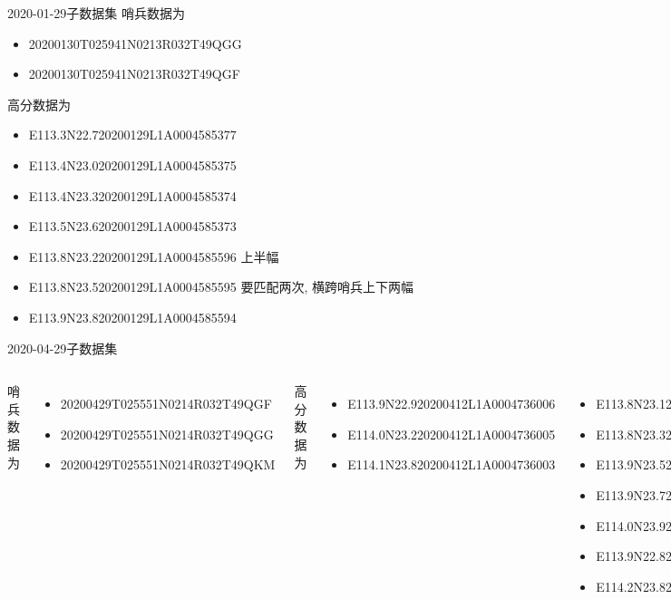 \begin{frame}{2020-01-29子数据集}
    \small 哨兵数据为
    \tiny
    \begin{itemize}
        \item 20200130T025941N0213R032T49QGG
        \item 20200130T025941N0213R032T49QGF
    \end{itemize}
    \small 高分数据为
    \tiny
    \begin{itemize}
        \item E113.3N22.720200129L1A0004585377
        \item E113.4N23.020200129L1A0004585375
        \item E113.4N23.320200129L1A0004585374
        \item E113.5N23.620200129L1A0004585373
        \item E113.8N23.220200129L1A0004585596 上半幅
        \item E113.8N23.520200129L1A0004585595 要匹配两次, 横跨哨兵上下两幅
        \item E113.9N23.820200129L1A0004585594
    \end{itemize}
\end{frame}

\begin{frame}{2020-04-29子数据集}
    \begin{columns}
        \small 哨兵数据为
        \tiny
        \begin{itemize}
            \item 20200429T025551N0214R032T49QGF
            \item 20200429T025551N0214R032T49QGG
            \item 20200429T025551N0214R032T49QKM
        \end{itemize}
        \small 高分数据为
        \tiny
        \begin{itemize}
            \item E113.9N22.920200412L1A0004736006
            \item E114.0N23.220200412L1A0004736005
            \item E114.1N23.820200412L1A0004736003
        \end{itemize}

        \tiny
        \begin{itemize}
            \item E113.8N23.120200428L1A0004767988
            \item E113.8N23.320200428L1A0004767982
            \item E113.9N23.520200428L1A0004767976
            \item E113.9N23.720200428L1A0004768005
            \item E114.0N23.920200428L1A0004768001
            \item E113.9N22.820200428L1A0004768660
            \item E114.2N23.820200428L1A0004768656
        \end{itemize}
    \end{columns}
\end{frame}

